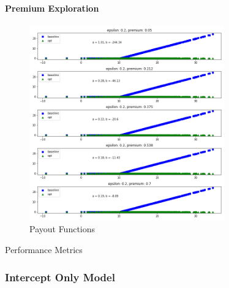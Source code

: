 \documentclass[11pt]{article}
\begin{document}
            \paragraph*{Premium Exploration}
                \begin{figure}[H]
                    \centering
                    \caption{Payout Functions}
                    \includegraphics[width=0.75\textwidth]{../../output/figures/CVaR/premium_exploration_full.png}
                \end{figure}

                \begin{table}[H]
                    \centering
                    \caption{Performance Metrics}
                    
                \end{table}

                \FloatBarrier

        \subsubsection*{Intercept Only Model}
\end{document}
